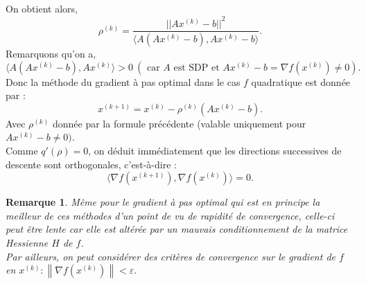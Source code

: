 \documentclass[12pt,a4paper,openay]{book}
\numberwithin{equation}{chapter}
\newtheorem{rmq}{Remarque}[chapter]
\begin{document}
	On obtient alors, 
	$$  \rho^{(k)} = \frac{{||Ax^{(k)} - b||}^2}{ \langle A\left( Ax^{(k)} - b\right),  Ax^{(k)} - b\rangle}. $$
	Remarquons qu'on a,
	$$ \langle A\left( Ax^{(k)} - b\right),  Ax^{(k)}\rangle > 0\  (\text{ car }A \text{ est SDP et } Ax^{(k)} - b = \nabla f\left(x^{(k)}\right) \neq 0).$$
	Donc la m\'ethode du gradient \`a pas optimal dans le cas $f$ quadratique est donn\'ee par :
	$$x^{(k+1)} = x^{(k)} - \rho^{(k)}(Ax^{(k)} - b).$$
	Avec $\rho^{(k)}$ donn\'ee par la formule pr\'ec\'edente (valable uniquement pour $Ax^{(k)} - b\neq 0).$\\
	Comme $q'(\rho) = 0$, on d\'eduit imm\'ediatement que les directions successives de descente sont orthogonales, c'est-\`a-dire :
	$$ \langle\nabla f\left(x^{(k+1)}\right), \nabla f\left(x^{(k)}\right)\rangle = 0 .$$
	\begin{rmq}
		M\^eme pour le gradient \`a pas optimal qui est en principe la meilleur de ces m\'ethodes d'un point de vu de rapidit\'e de convergence, celle-ci peut \^etre lente car elle est alt\'er\'ee par un mauvais conditionnement de la matrice Hessienne $H$ de $f$.\\
		Par ailleurs, on peut consid\'erer des crit\`eres de convergence sur le gradient de $f$ en $x^{(k)} : \left\|\nabla f\left(x^{(k)}\right)\right\| < \varepsilon.$
	\end{rmq}
	
	
	
\end{document}
